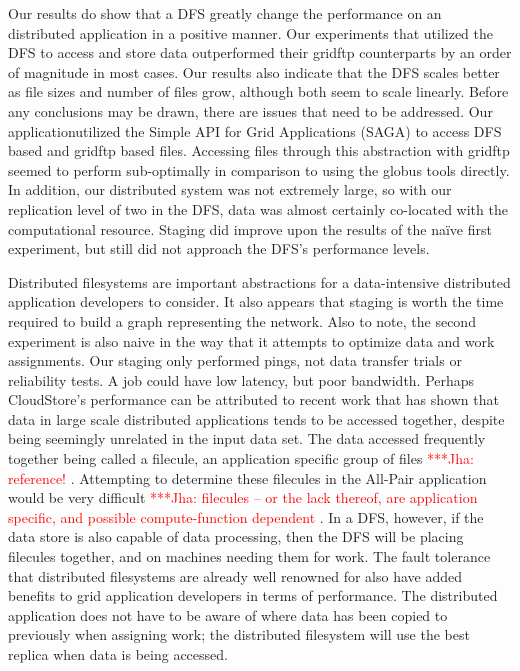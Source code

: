 \documentclass[a4paper,11pt]{article}
\newcommand{\jhanote}[1]{ {\textcolor{red} { ***Jha: #1 }}}
\newcommand{\jhanote}[1]{}
\begin{document}
Our results do show that a DFS greatly change the performance on an distributed application in a positive manner. Our experiments that utilized the DFS to access and store data outperformed their gridftp counterparts by an order of magnitude in most cases. Our results also indicate that the DFS scales better as file sizes and number of files grow, although both seem to scale linearly. Before any conclusions may be drawn, there are issues that need to be addressed. Our applicationutilized the Simple API for Grid Applications (SAGA) to access DFS based and gridftp based files. Accessing files through this abstraction with gridftp seemed to perform sub-optimally in comparison to using the globus tools directly. In addition, our distributed system was not extremely large, so with our replication level of two in the DFS, data was almost certainly co-located with the computational resource. Staging did improve upon the results of the naïve first experiment, but still did not approach the DFS's performance levels. 

Distributed filesystems are important abstractions for a data-intensive distributed application developers to consider. It also appears that staging is worth the time required to build a graph representing the network. Also to note, the second experiment is also naive in the way that it attempts to optimize data and work assignments. Our staging only performed pings, not data transfer trials or reliability tests. A job could have low latency, but poor bandwidth. Perhaps CloudStore's performance can be attributed to recent work that has shown that data in large scale distributed applications tends to be accessed together, despite being seemingly unrelated in the input data set. The data accessed frequently together being called a filecule, an application specific group of files \jhanote{reference!}. Attempting to determine these filecules in the All-Pair application would be very difficult\jhanote{filecules -- or the lack thereof, are application specific, and possible compute-function dependent}. In a DFS, however, if the data store is also capable of data processing, then the DFS will be placing filecules together, and on machines needing them for work. The fault tolerance that distributed filesystems are already well renowned for also have added benefits to grid application developers in terms of performance. The distributed application does not have to be aware of where data has been copied to previously when assigning work; the distributed filesystem will use the best replica when data is being accessed.

 
%
\end{document}
